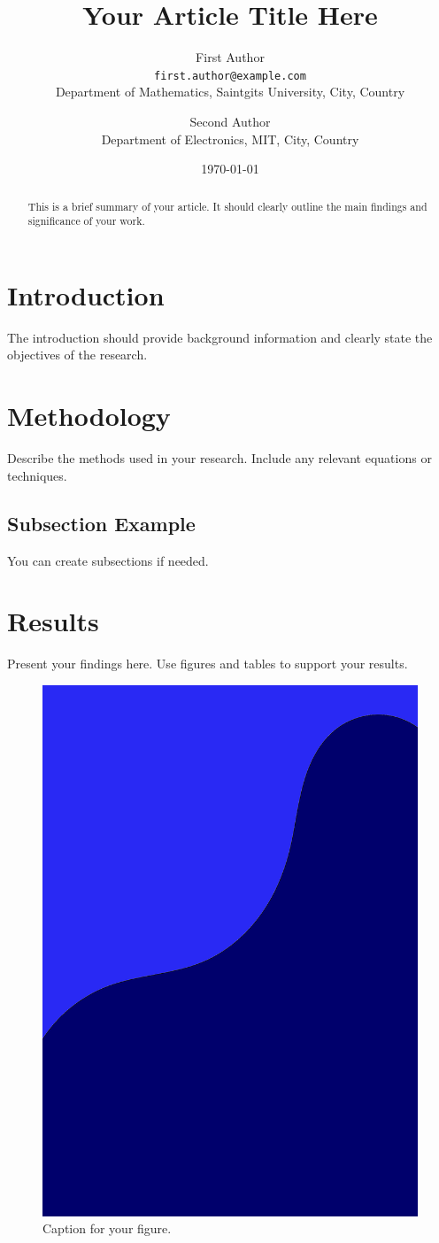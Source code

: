 \documentclass[10pt]{article}
\title{Your Article Title Here}
\author{First Author \\ \texttt{first.author@example.com} \\ Department of Mathematics, Saintgits University, City, Country \and Second Author \\ Department of Electronics, MIT, City, Country}
\date{\today}
\begin{document}
\maketitle

\begin{abstract}
This is a brief summary of your article. It should clearly outline the main findings and significance of your work.
\end{abstract}

\section{Introduction}
The introduction should provide background information and clearly state the objectives of the research.

\section{Methodology}
Describe the methods used in your research. Include any relevant equations or techniques.

\subsection{Subsection Example}
You can create subsections if needed.

\section{Results}
Present your findings here. Use figures and tables to support your results.

\begin{figure}[htbp]
    \centering
    \includegraphics[width=0.8\columnwidth]{cover.png}
    \caption{Caption for your figure.}
    \label{fig:example}
\end{figure}
\end{document}
